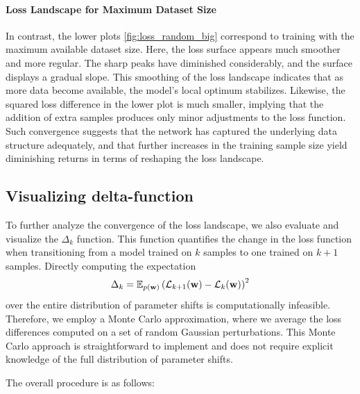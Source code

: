 \documentclass{article}
\begin{document}
\paragraph{Loss Landscape for Maximum Dataset Size}
In contrast, the lower plots \ref{fig:loss_random_big} correspond to training with the maximum available dataset size. Here, the loss
surface appears much smoother and more regular. The sharp peaks have diminished considerably, and the surface displays a gradual slope.
This smoothing of the loss landscape indicates that as more data become available, the model's local optimum stabilizes. Likewise, the
squared loss difference in the lower plot is much smaller, implying that the addition of extra samples produces only minor adjustments
to the loss function. Such convergence suggests that the network has captured the underlying data structure adequately, and that further
increases in the training sample size yield diminishing returns in terms of reshaping the loss landscape.

\subsection{Visualizing delta-function}

To further analyze the convergence of the loss landscape, we also evaluate and visualize the $\Delta_k$ function. This function 
quantifies the change in the loss function when transitioning from a model trained on $k$ samples to one trained on $k+1$ samples. 
Directly computing the expectation
$$\Delta_k = \mathbb{E}_{p(\mathbf{w})}\left( \mathcal{L}_{k+1}(\mathbf{w}) - \mathcal{L}_{k}(\mathbf{w}) \right)^2$$
over the entire distribution of parameter shifts is computationally infeasible. Therefore, we employ a Monte Carlo approximation, 
where we average the loss differences computed on a set of random Gaussian perturbations. This Monte Carlo approach is straightforward 
to implement and does not require explicit knowledge of the full distribution of parameter shifts.

The overall procedure is as follows:
\end{document}
